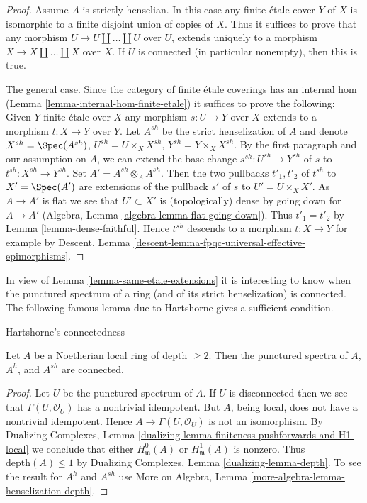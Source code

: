 \begin{proof}
Assume $A$ is strictly henselian. In this case any finite \'etale
cover $Y$ of $X$ is isomorphic to a finite disjoint union of
copies of $X$. Thus it suffices to prove that any morphism
$U \to U \amalg \ldots \amalg U$ over $U$, extends uniquely to a morphism
$X \to X \amalg \ldots \amalg X$ over $X$.
If $U$ is connected (in particular nonempty), then this is true.

\medskip\noindent
The general case. Since the category of finite \'etale coverings has an
internal hom (Lemma \ref{lemma-internal-hom-finite-etale})
it suffices to prove the following: Given $Y$ finite \'etale over $X$
any morphism $s : U \to Y$ over $X$ extends to a morphism $t : X \to Y$
over $Y$. Let $A^{sh}$ be the strict henselization of $A$ and denote
$X^{sh} = \Spec(A^{sh})$, $U^{sh} = U \times_X X^{sh}$,
$Y^{sh} = Y \times_X X^{sh}$. By the first paragraph and our assumption
on $A$, we can extend the base change $s^{sh} : U^{sh} \to Y^{sh}$ of $s$ to
$t^{sh} : X^{sh} \to Y^{sh}$. Set $A' = A^{sh} \otimes_A A^{sh}$.
Then the two pullbacks $t'_1, t'_2$ of $t^{sh}$ to $X' = \Spec(A')$
are extensions of the pullback $s'$ of $s$ to $U' = U \times_X X'$.
As $A \to A'$ is flat we see that $U' \subset X'$ is (topologically) dense
by going down for $A \to A'$
(Algebra, Lemma \ref{algebra-lemma-flat-going-down}). Thus
$t'_1 = t'_2$ by Lemma \ref{lemma-dense-faithful}.
Hence $t^{sh}$ descends to a morphism $t : X \to Y$
for example by
Descent, Lemma \ref{descent-lemma-fpqc-universal-effective-epimorphisms}.
\end{proof}

\noindent
In view of Lemma \ref{lemma-same-etale-extensions}
it is interesting to know when the
punctured spectrum of a ring (and of its strict henselization)
is connected. The following famous lemma due to Hartshorne
gives a sufficient condition.

\begin{lemma}
\label{lemma-depth-2-connected-punctured-spectrum}
\begin{reference}
\cite[Proposition 2.1]{Hartshorne-connectedness}
\end{reference}
\begin{slogan}
Hartshorne's connectedness
\end{slogan}
Let $A$ be a Noetherian local ring of depth $\geq 2$.
Then the punctured spectra of $A$, $A^h$, and $A^{sh}$ are connected.
\end{lemma}

\begin{proof}
Let $U$ be the punctured spectrum of $A$.
If $U$ is disconnected then we see that
$\Gamma(U, \mathcal{O}_U)$ has a nontrivial idempotent.
But $A$, being local, does not have a nontrivial idempotent.
Hence $A \to \Gamma(U, \mathcal{O}_U)$ is not an isomorphism.
By Dualizing Complexes, Lemma
\ref{dualizing-lemma-finiteness-pushforwards-and-H1-local}
we conclude that either $H^0_\mathfrak m(A)$ or $H^1_\mathfrak m(A)$
is nonzero. Thus $\text{depth}(A) \leq 1$ by
Dualizing Complexes, Lemma \ref{dualizing-lemma-depth}.
To see the result for $A^h$ and $A^{sh}$ use
More on Algebra, Lemma \ref{more-algebra-lemma-henselization-depth}.
\end{proof}

